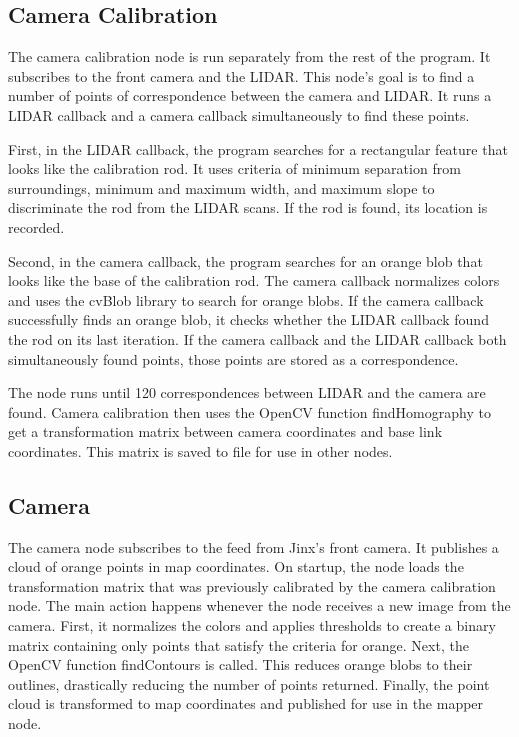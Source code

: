 \documentclass{article}
\begin{document}
\subsection{Camera Calibration}

The camera calibration node is run separately from the rest of the program.  It subscribes to the front camera and the LIDAR.  This node's goal is to find a number of points of correspondence between the camera and LIDAR.  It runs a LIDAR callback and a camera callback simultaneously to find these points.

First, in the LIDAR callback, the program searches for a rectangular feature that looks like the calibration rod.  It uses criteria of minimum separation from surroundings, minimum and maximum width, and maximum slope to discriminate the rod from the LIDAR scans.  If the rod is found, its location is recorded.

Second, in the camera callback, the program searches for an orange blob that looks like the base of the calibration rod.  The camera callback normalizes colors and uses the cvBlob library to search for orange blobs.  If the camera callback successfully finds an orange blob, it checks whether the LIDAR callback found the rod on its last iteration.  If the camera callback and the LIDAR callback both simultaneously found points, those points are stored as a correspondence.

The node runs until 120 correspondences between LIDAR and the camera are found.  Camera calibration then uses the OpenCV function findHomography to get a transformation matrix between camera coordinates and base link coordinates.  This matrix is saved to file for use in other nodes. 

\subsection{Camera}

The camera node subscribes to the feed from Jinx's front camera.  It publishes a cloud of orange points in map coordinates.  On startup, the node loads the transformation matrix that was previously calibrated by the camera calibration node.  The main action happens whenever the node receives a new image from the camera.  First, it normalizes the colors and applies thresholds to create a binary matrix containing only points that satisfy the criteria for orange.  Next, the OpenCV function findContours is called.  This reduces orange blobs to their outlines, drastically reducing the number of points returned.
Finally, the point cloud is transformed to map coordinates and published for use in the mapper node.
\end{document}
